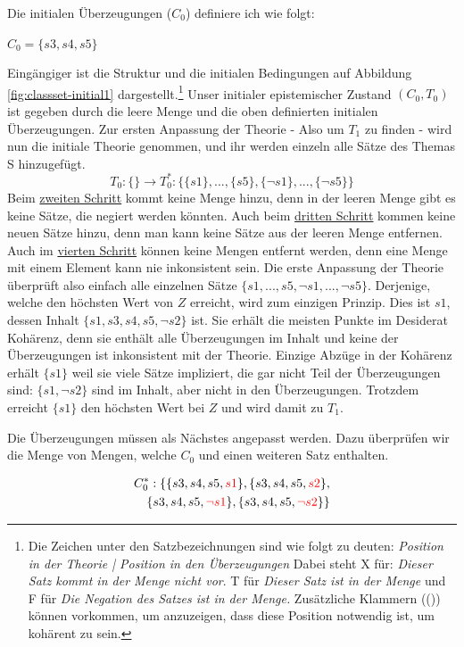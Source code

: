 \documentclass{article}
\begin{document}
 Die initialen Überzeugungen ($C_0$) definiere ich wie folgt:
 
 $C_0 = \{s3, s4, s5\}$
 
 Eingängiger ist die Struktur und die initialen Bedingungen auf Abbildung \ref{fig:classset-initial1} dargestellt.\footnote{Die Zeichen unter den Satzbezeichnungen sind wie folgt zu deuten: \textit{Position in der Theorie | Position in den Überzeugungen} Dabei steht X für: \textit{Dieser Satz kommt in der Menge nicht vor}. T für \textit{Dieser Satz ist in der Menge} und F für \textit{Die Negation des Satzes ist in der Menge.} Zusätzliche Klammern (()) können vorkommen, um anzuzeigen, dass diese Position notwendig ist, um kohärent zu sein.}
 Unser initialer epistemischer Zustand $(C_0, T_0)$ ist gegeben durch die leere Menge und die oben definierten initialen Überzeugungen. Zur ersten Anpassung der Theorie - Also um $T_1$ zu finden - wird nun die initiale Theorie genommen, und ihr werden einzeln alle Sätze des Themas S hinzugefügt.
 $$
 T_0: \{\} \longrightarrow T_0^*: \{\{s1\},...,\{s5\}, \{\neg s1\}, ..., \{\neg s5\}\}
 $$
 Beim \hyperref[1.1]{zweiten Schritt} kommt keine Menge hinzu, denn in der leeren Menge gibt es keine Sätze, die negiert werden könnten. Auch beim \hyperref[2]{dritten Schritt} kommen keine neuen Sätze hinzu, denn man kann keine Sätze aus der leeren Menge entfernen. Auch im \hyperref[konsistenzfilter]{vierten Schritt} können keine Mengen entfernt werden, denn eine Menge mit einem Element kann nie inkonsistent sein. Die erste Anpassung der Theorie überprüft also einfach alle einzelnen Sätze $\{s1,...,s5, \neg s1, ..., \neg s5\}$. Derjenige, welche den höchsten Wert von $Z$ erreicht, wird zum einzigen Prinzip. Dies ist $s1$, dessen Inhalt $\{s1,s3,s4,s5,\neg s2\}$ ist. Sie erhält die meisten Punkte im Desiderat Kohärenz, denn sie enthält alle Überzeugungen im Inhalt und keine der Überzeugungen ist inkonsistent mit der Theorie. Einzige Abzüge in der Kohärenz erhält $\{s1\}$ weil sie viele Sätze impliziert, die gar nicht Teil der Überzeugungen sind: $\{s1, \neg s2\}$ sind im Inhalt, aber nicht in den Überzeugungen. Trotzdem erreicht $\{s1\}$ den höchsten Wert bei $Z$ und wird damit zu $T_1$.
 
 Die Überzeugungen müssen als Nächstes angepasst werden. Dazu überprüfen wir die Menge von Mengen, welche $C_0$ und einen weiteren Satz enthalten.
 
 \begin{equation} \notag
 \begin{split}
 C_0^*: \{\{s3, s4, s5, \textcolor{red}{s1}\}, \{s3, s4, s5, \textcolor{red}{s2}\}, \\
 \{s3, s4, s5, \textcolor{red}{\neg s1}\}, \{s3, s4, s5, \textcolor{red}{\neg s2}\}\}
 \end{split}
 \end{equation}
 
\end{document}
